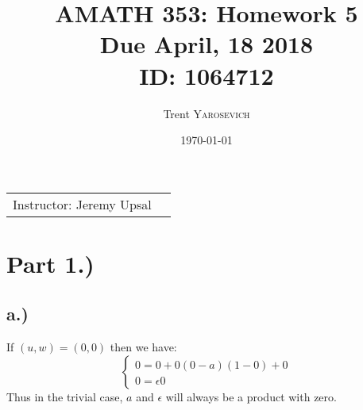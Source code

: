 \documentclass{article}
\title{AMATH 353: Homework 5 \\Due April, 18 2018 \\ ID: 1064712} %
\author{Trent \textsc{Yarosevich}} %
\date{\today} %
\begin{document}
\maketitle %
\setlength\parindent{1cm}

\begin{center}
\begin{tabular}{l r}
Instructor: Jeremy Upsal %
\end{tabular}
\end{center}


\section*{Part 1.)} 
\subsection*{a.)}
If $(u,w) = (0, 0)$ then we have:
\[
  \begin{cases}
               0 = 0 + 0(0 - a)(1-0) + 0\\
               0 = \epsilon 0
            \end{cases}
\]
Thus in the trivial case, $a$ and $\epsilon$ will always be a product with zero.
\end{document}
